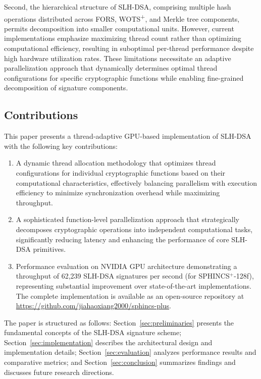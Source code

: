 \documentclass[journal]{IEEEtran}
\begin{document}
Second, the hierarchical structure of SLH-DSA, comprising multiple hash operations distributed across FORS, WOTS\textsuperscript{+}, and Merkle tree components, permits decomposition into smaller computational units. However, current implementations emphasize maximizing thread count rather than optimizing computational efficiency, resulting in suboptimal per-thread performance despite high hardware utilization rates.
These limitations necessitate an adaptive parallelization approach that dynamically determines optimal thread configurations for specific cryptographic functions while enabling fine-grained decomposition of signature components.

\subsection{Contributions}

This paper presents a thread-adaptive GPU-based implementation of SLH-DSA with the following key contributions:

\begin{enumerate}
  \item A dynamic thread allocation methodology that optimizes thread configurations for individual cryptographic functions based on their computational characteristics, effectively balancing parallelism with execution efficiency to minimize synchronization overhead while maximizing throughput.

  \item A sophisticated function-level parallelization approach that strategically decomposes cryptographic operations into independent computational tasks, significantly reducing latency and enhancing the performance of core SLH-DSA primitives.

  \item Performance evaluation on NVIDIA GPU architecture demonstrating a throughput of 62,239 SLH-DSA signatures per second (for SPHINCS$^+$-128f), representing substantial improvement over state-of-the-art implementations.
    The complete implementation is available as an open-source repository at \url{https://github.com/jiahaoxiang2000/sphincs-plus}.
\end{enumerate}

The paper is structured as follows: Section~\ref{sec:preliminaries} presents the fundamental concepts of the SLH-DSA signature scheme; Section~\ref{sec:implementation} describes the architectural design and implementation details; Section~\ref{sec:evaluation} analyzes performance results and comparative metrics; and Section~\ref{sec:conclusion} summarizes findings and discusses future research directions.
\end{document}
